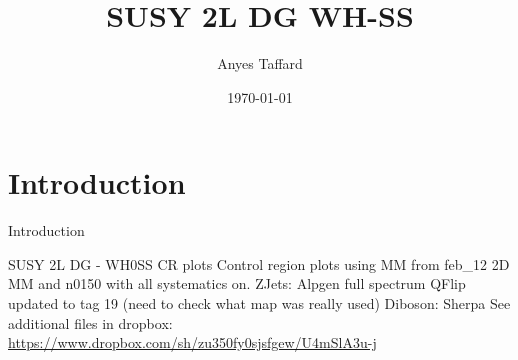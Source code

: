 \documentclass[10pt]{beamer}
\begin{document}

\newcommand{\METrel}{\ensuremath{E_\mathrm{T}^\mathrm{miss,rel}}}
\newcommand{\meff}{\ensuremath{m_{\mathrm{eff}}}}
\newcommand{\mt}{\ensuremath{m_\mathrm{T}}}
\newcommand{\pTmiss}{\ensuremath{\mathbf{p}_\mathrm{T}^\mathrm{miss}}}
\newcommand{\mll}{\ensuremath{m_{\ell\ell}}}
\newcommand{\pTll}{\ensuremath{p_\mathrm{T,\ell\ell}}}
\newcommand{\dphill}{\ensuremath{\Delta\phi_{\ell\ell}}}
\newcommand{\dRll}{\ensuremath{\Delta R_{\ell\ell}}}
\newcommand{\mjj}{\ensuremath{m_{jj}}}
\newcommand{\mljj}{\ensuremath{m_{ljj}}}


\author{Anyes Taffard}
\date{\today}

\title[SUSY 2L WH SS ]{SUSY 2L DG WH-SS}

\begin{frame}[plain]
  \titlepage
\end{frame}

\section{Introduction}
\begin{frame}{Introduction}
  \begin{block}{SUSY 2L DG - WH0SS CR plots }
    Control region plots using MM from feb\_12 2D MM and n0150 with all systematics on.
    ZJets: Alpgen full spectrum
    QFlip updated to tag 19 (need to check what map was really used)
    Diboson: Sherpa
    See additional files in dropbox: {\url {https://www.dropbox.com/sh/zu350fy0sjsfgew/U4mSlA3u-j}}
  \end{block}
\end{frame}
\end{document}
